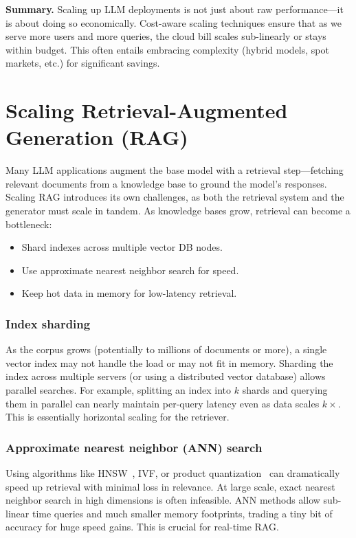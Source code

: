 \medskip
\noindent\textbf{Summary.} Scaling up LLM deployments is not just about raw performance---it is about doing so economically. Cost-aware scaling techniques ensure that as we serve more users and more queries, the cloud bill scales sub-linearly or stays within budget. This often entails embracing complexity (hybrid models, spot markets, etc.) for significant savings.

\section{Scaling Retrieval-Augmented Generation (RAG)}
\label{sec:scaling-rag}
Many LLM applications augment the base model with a retrieval step---fetching relevant documents from a knowledge base to ground the model’s responses. Scaling RAG introduces its own challenges, as both the retrieval system and the generator must scale in tandem. As knowledge bases grow, retrieval can become a bottleneck:
\begin{itemize}
    \item Shard indexes across multiple vector DB nodes.
    \item Use approximate nearest neighbor search for speed.
    \item Keep hot data in memory for low-latency retrieval.
\end{itemize}

\subsubsection{Index sharding}
As the corpus grows (potentially to millions of documents or more), a single vector index may not handle the load or may not fit in memory. Sharding the index across multiple servers (or using a distributed vector database) allows parallel searches. For example, splitting an index into $k$ shards and querying them in parallel can nearly maintain per-query latency even as data scales $k\times$. This is essentially horizontal scaling for the retriever.

\subsubsection{Approximate nearest neighbor (ANN) search}
Using algorithms like HNSW~\cite{Malkov2018HNSW}, IVF, or product quantization~\cite{Jegou2011PQ} can dramatically speed up retrieval with minimal loss in relevance. At large scale, exact nearest neighbor search in high dimensions is often infeasible. ANN methods allow sub-linear time queries and much smaller memory footprints, trading a tiny bit of accuracy for huge speed gains. This is crucial for real-time RAG.


